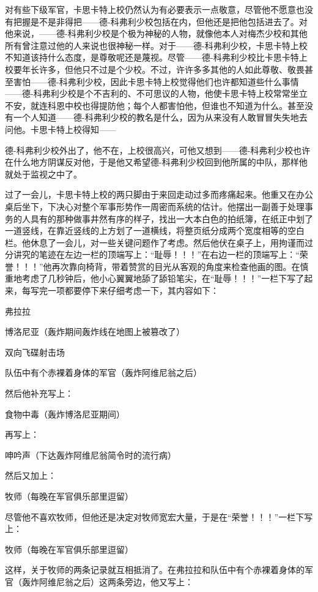     对有些下级军官，卡思卡特上校仍然认为有必要表示一点敬意，尽管他不愿意也没有把握是不是非得把——德-科弗利少校包括在内，但他还是把他包括进去了。对他来说，——德-科弗利少校是个极为神秘的人物，就像他本人对梅杰少校和其他所有曾注意过他的人来说也很神秘一样。对于——德-科弗利少校，卡思卡特上校不知道该持什么态度，是尊敬呢还是蔑视。尽管——德-科弗利少校比卡思卡特上校要年长许多，但他只不过是个少校。不过，许许多多其他的人如此尊敬、敬畏甚至害怕——德-科弗利少校，因此卡思卡特上校觉得他们也许都知道些什么事情——德-科弗利少校是个不吉利的、不可思议的人物，他使卡思卡特上校常常坐立不安，就连科恩中校也得提防他；每个人都害怕他，但谁也不知道为什么。甚至没有一个人知道——德-科弗利少校的教名是什么，因为从来没有人敢冒冒失失地去问他。卡思卡特上校得知——

 


    德-科弗利少校外出了，他不在，上校很高兴，可他又想到——德-科弗利少校也许在什么地方阴谋反对他，于是他又希望德-科弗利少校回到他所属的中队，那样他就处于监视之中了。

    过了一会儿，卡思卡特上校的两只脚由于来回走动过多而疼痛起来。他重又在办公桌后坐下，下决心对整个军事形势作一周密而系统的估计。他摆出一副善于处理事务的人具有的那种做事井然有序的样子，找出一大本白色的拍纸簿，在纸正中划了一道竖线，在靠近竖线的上方划了一道横线，将整页纸分成两个宽度相等的空白栏。他休息了一会儿，对一些关键问题作了考虑。然后他伏在桌子上，用拘谨而过分讲究的笔迹在左边一栏的顶端写上：“耻辱！！！”在右边一栏的顶端写上：“荣誉！！！”他再次靠向椅背，带着赞赏的目光从客观的角度来检查他画的图。在慎重地考虑了几秒钟后，他小心翼翼地舔了舔铅笔尖，在“耻辱！！！”一栏下写了起来，每写完一项都要停下来仔细考虑一下，其内容如下：

    弗拉拉

    博洛尼亚（轰炸期间轰炸线在地图上被篡改了）

    双向飞碟射击场

    队伍中有个赤裸着身体的军官（轰炸阿维尼翁之后）

    然后他补充写上：

    食物中毒（轰炸博洛尼亚期间）

    再写上：

    呻吟声（下达轰炸阿维尼翁简令时的流行病）

    然后又加上：

    牧师（每晚在军官俱乐部里逗留）

    尽管他不喜欢牧师，但他还是决定对牧师宽宏大量，于是在“荣誉！！！”一栏下写上：

    牧师（每晚在军官俱乐部里逗留）

    这样，关于牧师的两条记录就互相抵消了。在弗拉拉和队伍中有个赤裸着身体的军官（轰炸阿维尼翁之后）这两条旁边，他又写上：

